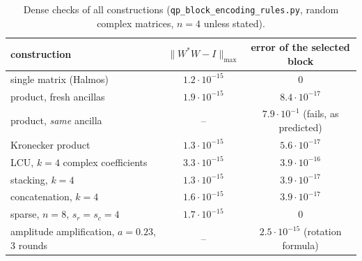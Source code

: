 \documentclass[11pt,a4paper]{article}
\begin{document}
\begin{table}[ht]
\centering\small
\begin{tabular}{lcc}
\toprule
construction & $\|W^*W-I\|_{\max}$ & error of the selected block\\
\midrule
single matrix (Halmos) & $1.2\cdot10^{-15}$ & $0$\\
product, fresh ancillas & $1.9\cdot10^{-15}$ & $8.4\cdot10^{-17}$\\
product, \emph{same} ancilla & -- & $7.9\cdot10^{-1}$ (fails, as predicted)\\
Kronecker product & $1.3\cdot10^{-15}$ & $5.6\cdot10^{-17}$\\
LCU, $k=4$ complex coefficients & $3.3\cdot10^{-15}$ & $3.9\cdot10^{-16}$\\
stacking, $k=4$ & $1.3\cdot10^{-15}$ & $3.9\cdot10^{-17}$\\
concatenation, $k=4$ & $1.6\cdot10^{-15}$ & $3.9\cdot10^{-17}$\\
sparse, $n=8$, $s_r=s_c=4$ & $1.7\cdot10^{-15}$ & $0$\\
amplitude amplification, $a=0.23$, 3 rounds & -- & $2.5\cdot10^{-15}$ (rotation formula)\\
\bottomrule
\end{tabular}
\caption{Dense checks of all constructions
(\texttt{qp\_block\_encoding\_rules.py}, random complex matrices, $n=4$ unless
stated).}
\label{tab:check}
\end{table}
\end{document}
